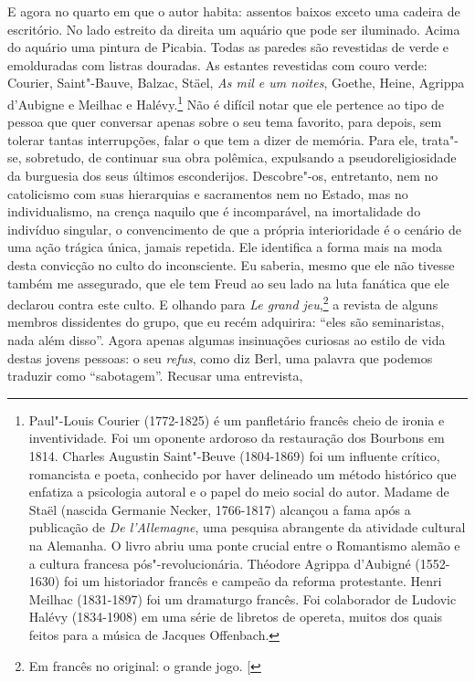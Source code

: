 E agora no quarto em que o autor habita: assentos baixos exceto uma
cadeira de escritório. No lado estreito da direita um aquário que pode
ser iluminado. Acima do aquário uma pintura de Picabia. Todas as paredes
são revestidas de verde e emolduradas com listras douradas. As estantes
revestidas com couro verde: Courier, Saint"-Bauve, Balzac, Stäel,
\emph{As mil e um noites}, Goethe, Heine, Agrippa d'Aubigne e Meilhac e
Halévy.\footnote{Paul"-Louis Courier (1772-1825) é um panfletário
  francês cheio de ironia e inventividade. Foi um oponente ardoroso da
  restauração dos Bourbons em 1814. Charles Augustin Saint"-Beuve
  (1804-1869) foi um influente crítico, romancista e poeta, conhecido
  por haver delineado um método histórico que enfatiza a psicologia
  autoral e o papel do meio social do autor. Madame de Staël (nascida
  Germanie Necker, 1766-1817) alcançou a fama após a publicação de
  \emph{De l'Allemagne}, uma pesquisa abrangente da atividade cultural
  na Alemanha. O livro abriu uma ponte crucial entre o Romantismo alemão
  e a cultura francesa pós"-revolucionária. Théodore Agrippa d'Aubigné
  (1552-1630) foi um historiador francês e campeão da reforma
  protestante. Henri Meilhac (1831-1897) foi um dramaturgo francês. Foi
  colaborador de Ludovic Halévy (1834-1908) em uma série de libretos de
  opereta, muitos dos quais feitos para a música de Jacques Offenbach. \versal{[N. E.]}}
Não é difícil notar que ele pertence ao tipo de pessoa que quer conversar apenas sobre o seu tema favorito, para depois, sem tolerar tantas interrupções, falar o que tem a dizer de memória. Para
ele, trata"-se, sobretudo, de continuar sua obra polêmica, expulsando a
pseudoreligiosidade da burguesia dos seus últimos esconderijos.
Descobre"-os, entretanto, nem no catolicismo com suas hierarquias e
sacramentos nem no Estado, mas no individualismo, na crença naquilo que
é incomparável, na imortalidade do indivíduo singular, o convencimento
de que a própria interioridade é o cenário de uma ação trágica única,
jamais repetida. Ele identifica a forma mais na moda desta convicção no
culto do inconsciente. Eu saberia, mesmo que ele não tivesse também me assegurado, que ele tem Freud ao seu lado na luta fanática que ele declarou contra este culto. E olhando para \emph{Le grand jeu},\footnote{Em francês no original: o grande jogo. {[}\versal{N. T.}{]}} a revista de
alguns membros dissidentes do grupo, que eu recém adquirira: ``eles são
seminaristas, nada além disso''. Agora apenas algumas insinuações
curiosas ao estilo de vida destas jovens pessoas: o seu \emph{refus},
como diz Berl, uma palavra que podemos traduzir como ``sabotagem''. Recusar uma entrevista,
